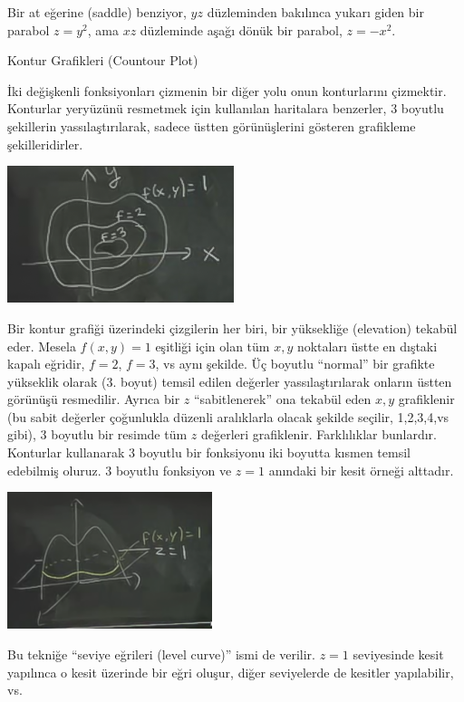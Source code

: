 \documentclass[12pt,fleqn]{article}\usepackage{../../common}
\begin{document}
Bir at eğerine (saddle) benziyor, $yz$ düzleminden bakılınca yukarı giden bir
parabol $z=y^2$, ama $xz$ düzleminde aşağı dönük bir parabol, $z=-x^2$.

Kontur Grafikleri (Countour Plot)

İki değişkenli fonksiyonları çizmenin bir diğer yolu onun konturlarını
çizmektir. Konturlar yeryüzünü resmetmek için kullanılan haritalara benzerler, 3
boyutlu şekillerin yassılaştırılarak, sadece üstten görünüşlerini gösteren
grafikleme şekilleridirler.

\begin{center}
\includegraphics[height=4cm]{8_7.png}
\end{center}

Bir kontur grafiği üzerindeki çizgilerin her biri, bir yüksekliğe (elevation)
tekabül eder.  Mesela $f(x,y)=1$ eşitliği için olan tüm $x,y$ noktaları üstte en
dıştaki kapalı eğridir, $f=2$, $f=3$, vs aynı şekilde. Üç boyutlu ``normal'' bir
grafikte yükseklik olarak (3. boyut) temsil edilen değerler yassılaştırılarak
onların üstten görünüşü resmedilir. Ayrıca bir $z$ ``sabitlenerek'' ona tekabül
eden $x,y$ grafiklenir (bu sabit değerler çoğunlukla düzenli aralıklarla olacak
şekilde seçilir, 1,2,3,4,vs gibi), 3 boyutlu bir resimde tüm $z$ değerleri
grafiklenir. Farklılıklar bunlardır. Konturlar kullanarak 3 boyutlu bir
fonksiyonu iki boyutta kısmen temsil edebilmiş oluruz. 3 boyutlu fonksiyon ve
$z=1$ anındaki bir kesit örneği alttadır.

\begin{center}
\includegraphics[height=4cm]{8_8.png}
\end{center}

Bu tekniğe ``seviye eğrileri (level curve)'' ismi de verilir. $z=1$ seviyesinde
kesit yapılınca o kesit üzerinde bir eğri oluşur, diğer seviyelerde de kesitler
yapılabilir, vs.
\end{document}
